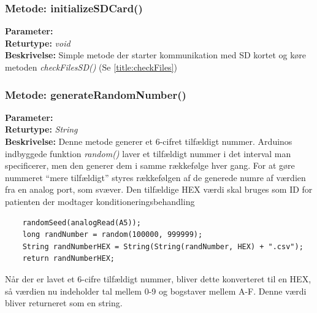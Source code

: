 \subsubsection{Metode: initializeSDCard()}
\textbf{Parameter: } 
\\ \textbf{Returtype: } \textit{void}
\\ \textbf{Beskrivelse: }  Simple metode der starter kommunikation med SD kortet og køre metoden\textit{ checkFilesSD()} (Se \ref{title:checkFiles})

\subsubsection{Metode: generateRandomNumber()} \label{title:RandomNumber}
\textbf{Parameter: } 
\\ \textbf{Returtype: } \textit{String}
\\ \textbf{Beskrivelse: }  Denne metode generer et 6-cifret tilfældigt nummer. Arduinos indbyggede funktion \textit{random()} laver et tilfældigt nummer i det interval man specificerer, men den generer dem i samme rækkefølge hver gang. For at gøre nummeret “mere tilfældigt” styres rækkefølgen af de generede numre af værdien fra en analog port, som svæver. Den tilfældige HEX værdi skal bruges som ID for patienten der modtager konditioneringsbehandling 
\begin{lstlisting}
	randomSeed(analogRead(A5)); 
	long randNumber = random(100000, 999999); 
	String randNumberHEX = String(String(randNumber, HEX) +	".csv");
	return randNumberHEX; 
\end{lstlisting}
Når der er lavet et 6-cifre tilfældigt nummer, bliver dette konverteret til en HEX, så værdien nu indeholder tal mellem 0-9 og bogstaver mellem A-F. Denne værdi bliver returneret som en string. 


